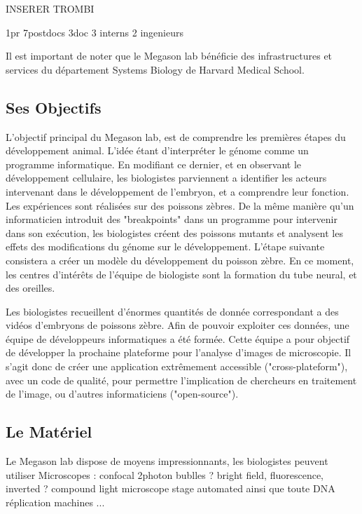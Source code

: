 INSERER TROMBI

1pr
7postdocs
3doc
3 interns
2 ingenieurs

Il est important de noter que le Megason lab bénéficie des infrastructures et services du département Systems Biology de Harvard Medical School.


\subsection{Ses Objectifs}         %
L'objectif principal du Megason lab, est de comprendre les premières étapes du développement animal.
L'idée étant d'interpréter le génome comme un programme informatique. En modifiant ce dernier, et en observant le développement cellulaire, les biologistes parviennent a identifier les acteurs intervenant dans le développement de l'embryon, et a comprendre leur fonction.
Les expériences sont réalisées sur des poissons zèbres. De la même manière qu'un informaticien introduit des "breakpoints" dans un programme pour intervenir dans son exécution, les biologistes créent des poissons mutants et analysent les effets des modifications du génome sur le développement.
L'étape suivante consistera a créer un modèle du développement du poisson zèbre. En ce moment, les centres d'intérêts de l'équipe de biologiste sont la formation du tube neural, et des oreilles.

Les biologistes recueillent d'énormes quantités de donnée correspondant a des vidéos d'embryons de poissons zèbre. Afin de pouvoir exploiter ces données, une équipe de développeurs informatiques a été formée. Cette équipe a pour objectif de développer la prochaine plateforme pour l'analyse d'images de microscopie. Il s'agit donc de créer une application extrêmement accessible ("cross-plateform"), avec un code de qualité, pour permettre l'implication de chercheurs en traitement de l'image, ou d'autres informaticiens ("open-source").

\subsection{Le Matériel} 
Le Megason lab dispose de moyens impressionnants, les biologistes peuvent utiliser
Microscopes :
confocal 2photon
bublles ? bright field, fluorescence, inverted ? compound light microscope stage automated
ainsi que toute 
DNA réplication machines ...







\begin{thebibliography}{9}
\end{thebibliography}


